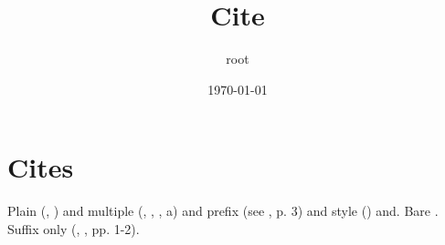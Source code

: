 \documentclass[11pt]{article}
\author{root}
\date{\today}
\title{Cite}
\begin{document}
\maketitle
\tableofcontents

\section{Cites}
\label{sec:org8235c36}
Plain (, ) and multiple (, , , a) and prefix (see ,  p. 3) and style () and.
Bare . Suffix only (, , pp. 1-2).
\end{document}
